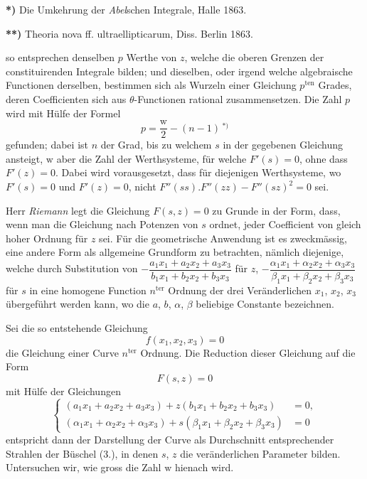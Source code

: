 \documentclass{article}
\begin{document}
\textbf{*)} Die Umkehrung der \emph{Abel}schen Integrale, Halle 1863.

\textbf{**)} Theoria nova ff. ultraellipticarum, Diss. Berlin 1863.

so entsprechen denselben $p$ Werthe von $z$, welche die oberen Grenzen der constituirenden Integrale bilden; und dieselben, oder irgend welche algebraische Functionen derselben, bestimmen sich als Wurzeln einer Gleichung $p^{\text{ten}}$ Grades, deren Coefficienten sich aus $\theta$-Functionen rational zusammensetzen. Die Zahl $p$ wird mit Hülfe der Formel
\[ p = \frac{\mathrm{w}}{2} - (n-1)\,{}^{*)} \]
gefunden; dabei ist $n$ der Grad, bis zu welchem $s$ in der gegebenen Gleichung ansteigt, $\mathrm{w}$ aber die Zahl der Werthsysteme, für welche $F'(s) = 0$, ohne dass $F'(z) = 0$. Dabei wird vorausgesetzt, dass für diejenigen Werthsysteme, wo $F'(s) = 0$ und $F'(z) = 0$, nicht $F''(ss).F''(zz) - F''(sz)^{2} = 0$ sei.

Herr \emph{Riemann} legt die Gleichung $F(s, z) = 0$ zu Grunde in der Form, dass, wenn man die Gleichung nach Potenzen von $s$ ordnet, jeder Coefficient von gleich hoher Ordnung für $z$ sei. Für die geometrische Anwendung ist es zweckmässig, eine andere Form als allgemeine Grundform zu betrachten, nämlich diejenige, welche durch Substitution von $-\dfrac{a_{1}x_{1} + a_{2}x_{2} + a_{3}x_{3}}{b_{1}x_{1} + b_{2}x_{2} + b_{3}x_{3}}$ für $z$, $-\dfrac{\alpha_{1}x_{1} + \alpha_{2}x_{2} + \alpha_{3}x_{3}}{\beta_{1}x_{1} + \beta_{2}x_{2} + \beta_{3}x_{3}}$ für $s$ in eine homogene Function $n^{\text{ter}}$ Ordnung der drei Veränderlichen $x_{1}$, $x_{2}$, $x_{3}$ übergeführt werden kann, wo die $a$, $b$, $\alpha$, $\beta$ beliebige Constante bezeichnen.

Sei die so entstehende Gleichung
\[ f(x_{1}, x_{2}, x_{3}) = 0 \tag{1.} \]
die Gleichung einer Curve $n^{\text{ter}}$ Ordnung. Die Reduction dieser Gleichung auf die Form
\[ F(s, z) = 0 \tag{2.} \]
mit Hülfe der Gleichungen
\[
\left\{
\begin{aligned}
(a_{1}x_{1} + a_{2}x_{2} + a_{3}x_{3}) + z(b_{1}x_{1} + b_{2}x_{2} + b_{3}x_{3}) &= 0, \\
(\alpha_{1}x_{1} + \alpha_{2}x_{2} + \alpha_{3}x_{3}) + s(\beta_{1}x_{1} + \beta_{2}x_{2} + \beta_{3}x_{3}) &= 0
\end{aligned}
\right.
\tag{3.}
\]
entspricht dann der Darstellung der Curve als Durchschnitt entsprechender Strahlen der Büschel (3.), in denen $s$, $z$ die veränderlichen Parameter bilden. Untersuchen wir, wie gross die Zahl $\mathrm{w}$ hienach wird.
\end{document}
